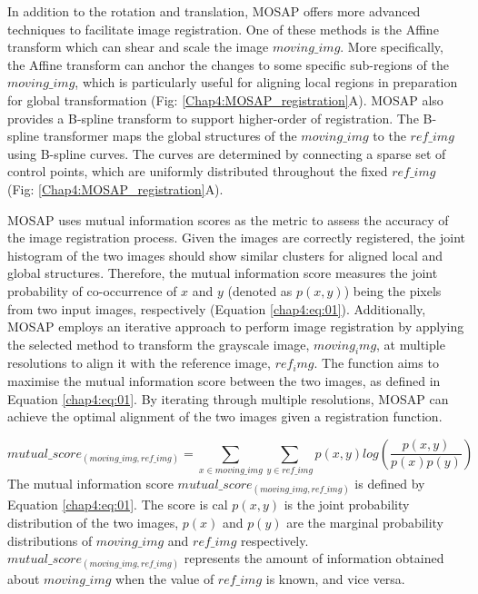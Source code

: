 In addition to the rotation and translation, MOSAP offers more advanced techniques to facilitate image registration. One of these methods is the Affine transform which can shear and scale the image $moving\_img$. More specifically, the Affine transform can anchor the changes to some specific sub-regions of the $moving\_img$, which is particularly useful for aligning local regions in preparation for global transformation (Fig: \ref{Chap4:MOSAP_registration}A). MOSAP also provides a B-spline transform to support higher-order of registration. The B-spline transformer maps the global structures of the $moving\_img$ to the $ref\_img$ using B-spline curves. The curves are determined by connecting a sparse set of control points, which are uniformly distributed throughout the fixed $ref\_img$ \cite{shackelford2011deformable} (Fig: \ref{Chap4:MOSAP_registration}A). 

MOSAP uses mutual information scores as the metric to assess the accuracy of the image registration process. Given the images are correctly registered, the joint histogram of the two images should show similar clusters for aligned local and global structures. Therefore, the mutual information score measures the joint probability of co-occurrence of $x$ and $y$ (denoted as $p(x,y)$) being the pixels from two input images, respectively (Equation \ref{chap4:eq:01}). Additionally, MOSAP employs an iterative approach to perform image registration by applying the selected method to transform the grayscale image, $moving_img$, at multiple resolutions to align it with the reference image, $ref_img$. The function aims to maximise the mutual information score between the two images, as defined in Equation \ref{chap4:eq:01}. By iterating through multiple resolutions, MOSAP can achieve the optimal alignment of the two images given a registration function.

\begin{equation}
    mutual\_score_{(moving\_img, ref\_img)} = \sum_{x \in moving\_img} \sum_{y \in ref\_img} p(x,y)log(\frac{p(x,y)}{p(x)p(y)})
\label{chap4:eq:01}
\end{equation}
The mutual information score $mutual\_score_{(moving\_img, ref\_img)}$ is defined by Equation \ref{chap4:eq:01}. The score is cal $p(x,y)$ is the joint probability distribution of the two images, $p(x)$ and $p(y)$ are the marginal probability distributions of $moving\_img$ and $ref\_img$ respectively. $mutual\_score_{(moving\_img, ref\_img)}$ represents the amount of information obtained about $moving\_img$ when the value of $ref\_img$ is known, and vice versa.  

